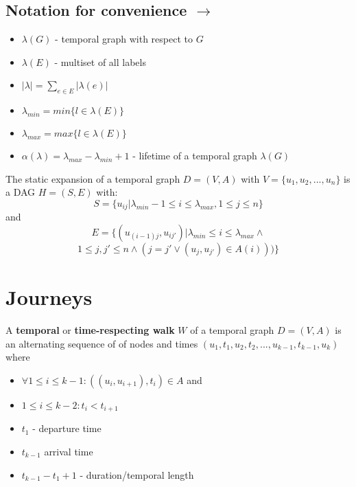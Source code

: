 \documentclass[12pt,a4paper]{article}
\begin{document}
\subsection{Notation for convenience $\rightarrow$ \cite[p. 243ff]{Michail2015}}
\begin{itemize}
	\item $\lambda(G)$ - temporal graph with respect to $G$
	\item $\lambda(E)$ - multiset of all labels
	\item $| \lambda | = \sum_{e \in E} | \lambda(e) | $
	\item $ \lambda_{min} = min\{l \in \lambda(E)\} $
	\item $ \lambda_{max} = max\{l \in \lambda(E)\} $
	\item $\alpha(\lambda) = \lambda_{max} - \lambda_{min} + 1$ - lifetime of a temporal graph $\lambda(G)$
\end{itemize}

\begin{tcolorbox}[title=Definition: static expansion of a graph]
  The static expansion of a temporal graph $D = (V, A)$ with $V = \{ u_1, u_2, ..., u_n \}$ is a DAG $H = (S, E)$ with:
  $$ S = \{ u_{ij} | \lambda_{min} - 1 \leq i \leq \lambda_{max}, 1 \leq j \leq n \} $$
  and
  $$ E = \{ (u_{(i - 1)j}, u_{ij'}) | \lambda_{min} \leq i \leq \lambda_{max} \land $$
  $$ 1 \leq j, j' \leq n \land (j = j' \lor (u_j, u_{j'}) \in A(i))) \} $$
\end{tcolorbox}
\section{Journeys}
\begin{tcolorbox}[title=Definition: temporal/time respecting walk]
  A \textbf{temporal} or \textbf{time-respecting walk} $W$ of a temporal graph $D = (V, A)$ is an alternating sequence of of nodes and times $(u_1 , t_1 , u_2 , t_2 , ... , u_{k-1} , t_{k-1} , u_k )$
  where 
  \begin{itemize}
    \item $\forall 1 \leq i \leq k - 1: ((u_i , u_{i+1} ), t_i ) \in A$ and
    \item $1 \leq i \leq k - 2: t_i < t_{i + 1}$ 
  \end{itemize}
\end{tcolorbox}
\begin{itemize}
  \item $t_1$ - departure time
  \item $t_{k - 1}$ arrival time
  \item $t_{k - 1} - t_1 + 1$ - duration/temporal length
\end{itemize}
\end{document}
